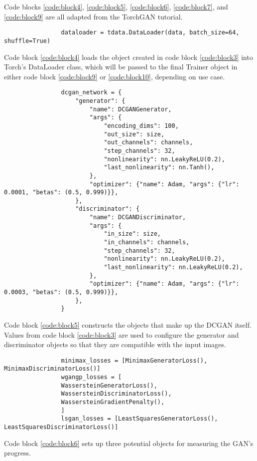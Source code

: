 \documentclass[11pt,letterpaper]{article}
\newenvironment{code}{\captionsetup{type=listing}}{}
\begin{document}
		Code blocks \ref{code:block4}, \ref{code:block5}, \ref{code:block6}, \ref{code:block7}, and \ref{code:block9} are all adapted from the TorchGAN tutorial.
		\begin{code}
			\caption{}
			\begin{verbatim}
				dataloader = tdata.DataLoader(data, batch_size=64, shuffle=True)
			\end{verbatim}
			\label{code:block4}
		\end{code}
		Code block \ref{code:block4} loads the object created in code block \ref{code:block3} into Torch's DataLoader class, which will be passed to the final Trainer object in either code block \ref{code:block9} or \ref{code:block10}, depending on use case.
		\begin{code}
			\caption{}
			\begin{verbatim}
				dcgan_network = {
					"generator": {
						"name": DCGANGenerator,
						"args": {
							"encoding_dims": 100,
							"out_size": size,
							"out_channels": channels,
							"step_channels": 32,
							"nonlinearity": nn.LeakyReLU(0.2),
							"last_nonlinearity": nn.Tanh(),
						},
						"optimizer": {"name": Adam, "args": {"lr": 0.0001, "betas": (0.5, 0.999)}},
					},
					"discriminator": {
						"name": DCGANDiscriminator,
						"args": {
							"in_size": size,
							"in_channels": channels,
							"step_channels": 32,
							"nonlinearity": nn.LeakyReLU(0.2),
							"last_nonlinearity": nn.LeakyReLU(0.2),
						},
						"optimizer": {"name": Adam, "args": {"lr": 0.0003, "betas": (0.5, 0.999)}},
					},
				}
			\end{verbatim}
			\label{code:block5}
		\end{code}
		Code block \ref{code:block5} constructs the objects that make up the DCGAN itself.
		Values from code block \ref{code:block3} are used to configure the generator and discriminator objects so that they are compatible with the input images.
		\begin{code}
			\caption{}
			\begin{verbatim}
				minimax_losses = [MinimaxGeneratorLoss(), MinimaxDiscriminatorLoss()]
				wgangp_losses = [
				WassersteinGeneratorLoss(),
				WassersteinDiscriminatorLoss(),
				WassersteinGradientPenalty(),
				]
				lsgan_losses = [LeastSquaresGeneratorLoss(), LeastSquaresDiscriminatorLoss()]
			\end{verbatim}
			\label{code:block6}
		\end{code}
		Code block \ref{code:block6} sets up three potential objects for measuring the GAN's progress.
\end{document}
